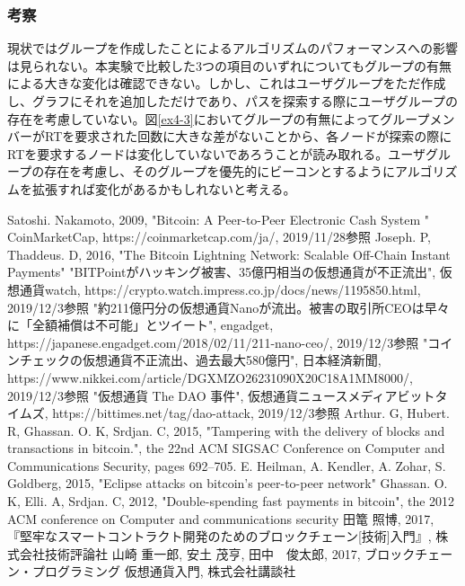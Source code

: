 \documentclass[12pt]{jarticle}
\begin{document}
\subsubsection{考察}
現状ではグループを作成したことによるアルゴリズムのパフォーマンスへの影響は見られない。本実験で比較した3つの項目のいずれについてもグループの有無による大きな変化は確認できない。しかし、これはユーザグループをただ作成し、グラフにそれを追加しただけであり、パスを探索する際にユーザグループの存在を考慮していない。図\ref{ex4-3}においてグループの有無によってグループメンバーがRTを要求された回数に大きな差がないことから、各ノードが探索の際にRTを要求するノードは変化していないであろうことが読み取れる。ユーザグループの存在を考慮し、そのグループを優先的にビーコンとするようにアルゴリズムを拡張すれば変化があるかもしれないと考える。

\begin{thebibliography}{9}
   Satoshi. Nakamoto, 2009, "Bitcoin: A Peer-to-Peer Electronic Cash System
"
   CoinMarketCap, https://coinmarketcap.com/ja/, 2019/11/28参照
   Joseph. P, Thaddeus. D, 2016, "The Bitcoin Lightning Network: Scalable Off-Chain Instant Payments"
   "BITPointがハッキング被害、35億円相当の仮想通貨が不正流出", 仮想通貨watch, https://crypto.watch.impress.co.jp/docs/news/1195850.html, 2019/12/3参照
   "約211億円分の仮想通貨Nanoが流出。被害の取引所CEOは早々に「全額補償は不可能」とツイート", engadget, https://japanese.engadget.com/2018/02/11/211-nano-ceo/, 2019/12/3参照
   "コインチェックの仮想通貨不正流出、過去最大580億円", 日本経済新聞, https://www.nikkei.com/article/DGXMZO26231090X20C18A1MM8000/, 2019/12/3参照
   "仮想通貨 The DAO 事件", 仮想通貨ニュースメディアビットタイムズ, https://bittimes.net/tag/dao-attack, 2019/12/3参照
   Arthur. G, Hubert. R, Ghassan. O. K, Srdjan. C, 2015, "Tampering with the delivery of blocks and transactions in bitcoin.", the 22nd ACM SIGSAC Conference on Computer and Communications Security, pages 692–705.
   E. Heilman, A. Kendler, A. Zohar, S. Goldberg, 2015, "Eclipse attacks on bitcoin’s peer-to-peer network" 
   Ghassan. O. K, Elli. A, Srdjan. C, 2012, "Double-spending fast payments in bitcoin", the 2012 ACM conference on Computer and communications security
   田篭 照博, 2017, 『堅牢なスマートコントラクト開発のためのブロックチェーン[技術]入門』, 株式会社技術評論社
   山崎 重一郎, 安土 茂亨, 田中　俊太郎, 2017, ブロックチェーン・プログラミング 仮想通貨入門, 株式会社講談社

\end{thebibliography}
\end{document}
